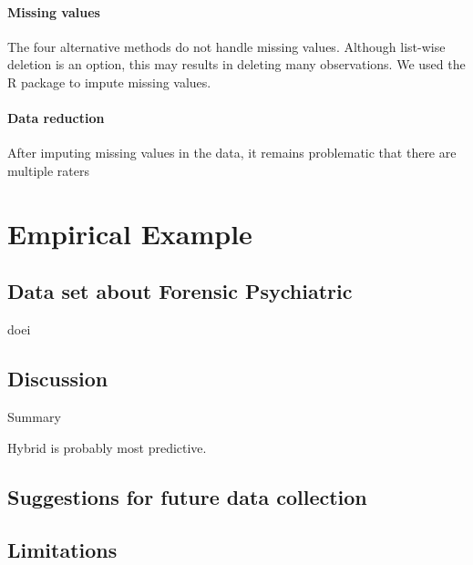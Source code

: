 \documentclass[a4paper,11pt]{article}
\begin{document}
\paragraph{Missing values}
The four alternative methods do not handle missing values.
Although list-wise deletion is an option, this may results in deleting many observations.
We used the R package  \parencite{vanBuuren2011mice} to impute missing values.


\paragraph{Data reduction}
After imputing missing values in the data, it remains problematic that there are multiple raters


\section{Empirical Example}

\subsection{Data set about Forensic Psychiatric}
doei
\subsection{Discussion}
Summary

Hybrid is probably most predictive.

\subsection{Suggestions for future data collection}



\subsection{Limitations}

\printbibliography
\end{document}
